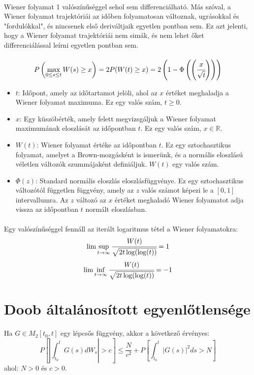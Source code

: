 \documentclass[11pt,a4paper]{article}
\begin{document}
				\paragraph{}
					Wiener folyamat 1 valószínűséggel sehol sem differenciálható. Más szóval, a Wiener folyamat trajektóriái az időben folyamatosan változnak, ugrásokkal és "fordulókkal", és nincsenek első deriváltjaik egyetlen pontban sem. Ez azt jelenti, hogy a Wiener folyamat trajektóriái nem simák, és nem lehet őket differenciálással leírni egyetlen pontban sem.
				\paragraph{}
					$$P\left( \max_{0 \le s \le t} W(s) \ge x\right) = 2P(W(t) \ge x) = 2 \left( 1- \Phi\left(\left( \cfrac{x}{\sqrt{t}} \right)\right) \right) $$
					\begin{itemize}
						\item $t$: Időpont, amely az időtartamot jelöli, ahol az $x$ értéket meghaladja a Wiener folyamat maximuma. Ez egy valós szám, $t \geq 0$.
						\item $x$: Egy küszöbérték, amely felett megvizsgáljuk a Wiener folyamat maximumának eloszlását az időpontban $t$. Ez egy valós szám, $x \in \mathbb{R}$.
						\item $W(t)$: Wiener folyamat értéke az időpontban $t$. Ez egy sztochasztikus folyamat, amelyet a Brown-mozgásként is ismerünk, és a normális eloszlású véletlen változók szummájaként definiáljuk. $W(t)$ egy valós szám.
						\item $\Phi(z)$: Standard normális eloszlás eloszlásfüggvénye. Ez egy sztochasztikus változótól független függvény, amely az $z$ valós számot képezi le a $[0,1]$ intervallumra. Az $z$ változó az $x$ értéket meghaladó Wiener folyamatot adja vissza az időpontban $t$ normált eloszlásban.
					\end{itemize}
				\paragraph{}
					Egy valószínűséggel fennáll az iterált logaritmus tétel a Wiener folyamatokra:
					$$\lim \sup_{t \to \infty} \cfrac{W(t)}{\sqrt{2t \log(\log(t))}} = 1$$
					$$\lim \inf_{t \to \infty} \cfrac{W(t)}{\sqrt{2t \log(\log(t))}} = -1$$
			\section{Doob általánosított egyenlőtlensége}
					\paragraph{}
						Ha $G \in M_2[t_0,t]$ egy lépcsős függvény, akkor a következő érvényes:
						$$
						P \left[ \left| \int_{t_0}^tG(s)dW_s \right| > c \right] \le \dfrac{N}{c^2} + P \left[ \int_{t_0}^t |G(s)|^2 ds > N \right]
						$$
						ahol: $N>0$ és $c > 0$.
\end{document}
